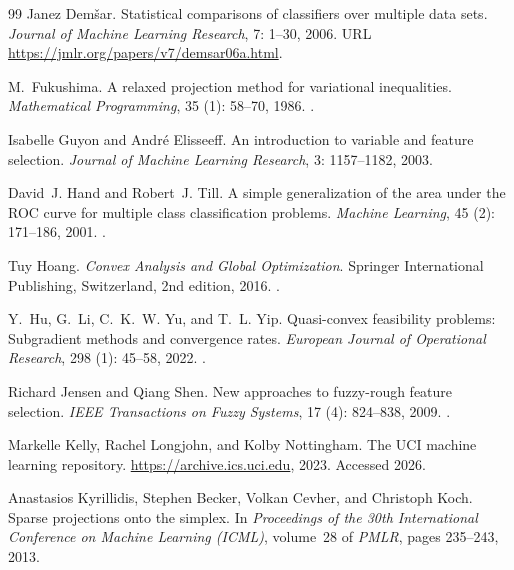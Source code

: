 \documentclass[]{interact}
\theoremstyle{plain}
\theoremstyle{definition}
\theoremstyle{remark}
\begin{document}
\begin{thebibliography}{99}
Janez Dem{\v{s}}ar.
\newblock Statistical comparisons of classifiers over multiple data sets.
\newblock \emph{Journal of Machine Learning Research}, 7: 1--30, 2006.
\newblock URL \url{https://jmlr.org/papers/v7/demsar06a.html}.

M.~Fukushima.
\newblock A relaxed projection method for variational inequalities.
\newblock \emph{Mathematical Programming}, 35 (1): 58--70, 1986.
\newblock {}.

Isabelle Guyon and Andr{\'e} Elisseeff.
\newblock An introduction to variable and feature selection.
\newblock \emph{Journal of Machine Learning Research}, 3: 1157--1182, 2003.

David~J. Hand and Robert~J. Till.
\newblock A simple generalization of the area under the {ROC} curve for multiple class classification problems.
\newblock \emph{Machine Learning}, 45 (2): 171--186, 2001.
\newblock {}.

Tuy Hoang.
\newblock \emph{Convex Analysis and Global Optimization}.
\newblock Springer International Publishing, Switzerland, 2nd edition, 2016.
\newblock {}.

Y.~Hu, G.~Li, C.~K.~W. Yu, and T.~L. Yip.
\newblock Quasi-convex feasibility problems: Subgradient methods and convergence rates.
\newblock \emph{European Journal of Operational Research}, 298 (1): 45--58, 2022.
\newblock {}.

Richard Jensen and Qiang Shen.
\newblock New approaches to fuzzy-rough feature selection.
\newblock \emph{IEEE Transactions on Fuzzy Systems}, 17 (4): 824--838, 2009.
\newblock {}.

Markelle Kelly, Rachel Longjohn, and Kolby Nottingham.
\newblock The {UCI} machine learning repository.
\newblock \url{https://archive.ics.uci.edu}, 2023.
\newblock Accessed 2026.

Anastasios Kyrillidis, Stephen Becker, Volkan Cevher, and Christoph Koch.
\newblock Sparse projections onto the simplex.
\newblock In \emph{Proceedings of the 30th International Conference on Machine Learning (ICML)}, volume~28 of \emph{PMLR}, pages 235--243, 2013.


\end{thebibliography}
\end{document}
